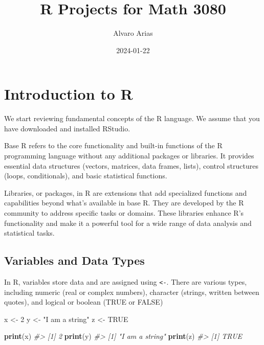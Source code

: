 \documentclass[
]{book}
\title{R Projects for Math 3080}
\author{Alvaro Arias}
\date{2024-01-22}
\newenvironment{Shaded}{\begin{snugshade}}{\end{snugshade}}
\newcommand{\CommentTok}[1]{\textcolor[rgb]{0.56,0.35,0.01}{\textit{#1}}}
\newcommand{\ConstantTok}[1]{\textcolor[rgb]{0.56,0.35,0.01}{#1}}
\newcommand{\DecValTok}[1]{\textcolor[rgb]{0.00,0.00,0.81}{#1}}
\newcommand{\FunctionTok}[1]{\textcolor[rgb]{0.13,0.29,0.53}{\textbf{#1}}}
\newcommand{\NormalTok}[1]{#1}
\newcommand{\OtherTok}[1]{\textcolor[rgb]{0.56,0.35,0.01}{#1}}
\newcommand{\StringTok}[1]{\textcolor[rgb]{0.31,0.60,0.02}{#1}}
\theoremstyle{definition}
\theoremstyle{definition}
\theoremstyle{definition}
\theoremstyle{definition}
\theoremstyle{remark}
\begin{document}
\maketitle

{
\setcounter{tocdepth}{1}
\tableofcontents
}
\hypertarget{introduction-to-r}{%
\chapter{Introduction to R}\label{introduction-to-r}}

We start reviewing fundamental concepts of the R language.
We assume that you have downloaded and installed RStudio.

Base R refers to the core functionality and built-in functions of the R programming language without any additional packages or libraries. It provides essential data structures (vectors, matrices, data frames, lists), control structures (loops, conditionals), and basic statistical functions.

Libraries, or packages, in R are extensions that add specialized functions and capabilities beyond what's available in base R. They are developed by the R community to address specific tasks or domains. These libraries enhance R's functionality and make it a powerful tool for a wide range of data analysis and statistical tasks.

\hypertarget{variables-and-data-types}{%
\section{Variables and Data Types}\label{variables-and-data-types}}

In R, variables store data and are assigned using \texttt{\textless{}-}. There are various types, including numeric (real or complex numbers), character (strings, written between quotes), and logical or boolean (TRUE or FALSE)

\begin{Shaded}
\begin{Highlighting}[]
\NormalTok{x }\OtherTok{\textless{}{-}} \DecValTok{2}
\NormalTok{y }\OtherTok{\textless{}{-}} \StringTok{"I am a string"}
\NormalTok{z }\OtherTok{\textless{}{-}} \ConstantTok{TRUE}

\FunctionTok{print}\NormalTok{(x)}
\CommentTok{\#\textgreater{} [1] 2}
\FunctionTok{print}\NormalTok{(y)}
\CommentTok{\#\textgreater{} [1] "I am a string"}
\FunctionTok{print}\NormalTok{(z)}
\CommentTok{\#\textgreater{} [1] TRUE}
\end{Highlighting}
\end{Shaded}
\end{document}
